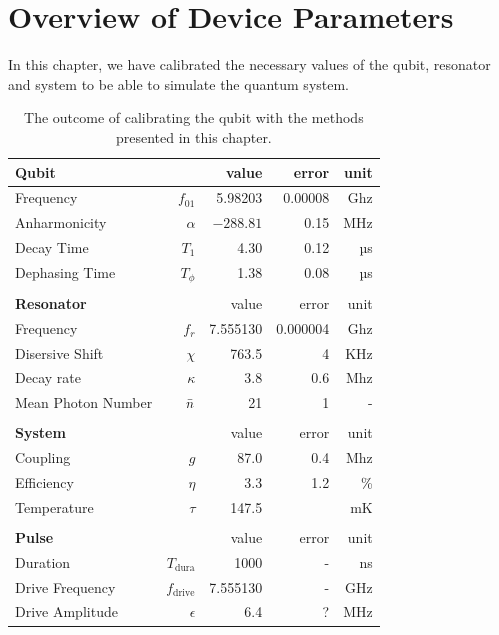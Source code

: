 


\section{Overview of Device Parameters}
In this chapter, we have calibrated the necessary values of the qubit, resonator and system to be able to simulate the quantum system.


\begin{table}[h]
\centering
\caption{The outcome of calibrating the qubit with the methods presented in this chapter.}
\begin{tabular}{lr|rrr}
\hline
\textbf{Qubit}                &          & value & error  & unit \\ \hline
Frequency                     & $f_{01}$ &  5.98203       &  0.00008  & Ghz  \\
Anharmonicity                 & $\alpha$ &  $-288.81$     &  0.15     & MHz  \\
Decay Time                    & $T_1$    &  4.30          &  0.12    & µs   \\
Dephasing Time                & $T_\phi$ &  1.38          &  0.08    & µs   \\ 
& & & & \\ \hline 

\textbf{Resonator}                &        & value      & error    & unit \\ \hline
Frequency                     & $f_{r}$    &  7.555130  & 0.000004 & Ghz  \\
Disersive Shift               & $\chi$     &  763.5     &  4       & KHz \\
Decay rate                    & $\kappa$   &  3.8       & 0.6      & Mhz  \\
Mean Photon Number            & $\Bar{n}$  &  21        & 1        &  -  \\
 

& & & & \\ \hline 
\textbf{System}                &          & value & error & unit \\ \hline
Coupling                       & $g$      &  87.0         & 0.4    & Mhz  \\
Efficiency                     & $\eta$   &  3.3          & 1.2    & \% \\
Temperature                    & $\tau$   & 147.5         &        & mK \\
& & & & \\ \hline

\hline
\textbf{Pulse}                &                 & value      & error    & unit \\ \hline
Duration                      & $T_{\text{dura}}$  &  1000     & -        & ns   \\
Drive Frequency               & $f_{\text{drive}}$ &  7.555130 & -        & GHz  \\ 
Drive Amplitude               & $\epsilon$         &  6.4      & ?        & MHz  \\ 
\end{tabular}
\label{tab:qubit_calibration}
\end{table}